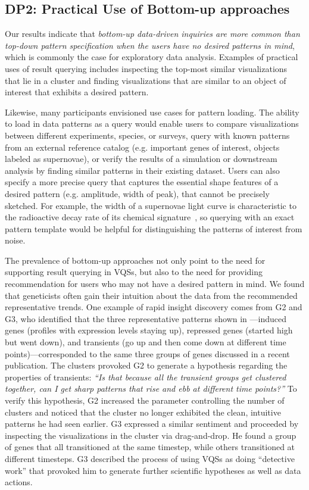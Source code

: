 \subsection{DP2: Practical Use of Bottom-up approaches}
\par Our results indicate that \emph{bottom-up data-driven inquiries are more common than top-down pattern specification when the users have no desired patterns in mind}, which is commonly the case for exploratory data analysis. Examples of practical uses of result querying includes inspecting the top-most similar visualizations that lie in a cluster and finding visualizations that are similar to an object of interest that exhibits a desired pattern. 
\par Likewise, many participants envisioned use cases for pattern loading. The ability to load in data patterns as a query would enable users to compare visualizations between different experiments, species, or surveys, query with known patterns from an external reference catalog (e.g. important genes of interest, objects labeled as supernovae), or verify the results of a simulation or downstream analysis by finding similar patterns in their existing dataset. Users can also specify a more precise query that captures the essential shape features of a desired pattern (e.g. amplitude, width of peak), that cannot be precisely sketched. For example, the width of a supernovae light curve is characteristic to the radioactive decay rate of its chemical signature~\cite{Nugent1997}, so querying with an exact pattern template would be helpful for distinguishing the patterns of interest from noise.
\par The prevalence of bottom-up approaches not only point to the need for supporting result querying in VQSs, but also to the need for providing recommendation for users who may not have a desired pattern in mind. We found that geneticists often gain their intuition about the data from the recommended representative trends. One example of rapid insight discovery comes from G2 and G3, who identified that the three representative patterns shown in \zv---induced genes (profiles with expression levels staying up), repressed genes (started high but went down), and transients (go up and then come down at different time points)---corresponded to the same three groups of genes discussed in a recent publication\cite{Gloss2017}. The clusters provoked G2 to generate a hypothesis regarding the properties of transients: \textit{``Is that because all the transient groups get clustered together, can I get sharp patterns that rise and ebb at different time points?''} To verify this hypothesis, G2 increased the parameter controlling the number of clusters and noticed that the cluster no longer exhibited the clean, intuitive patterns he had seen earlier. G3 expressed a similar sentiment and proceeded by inspecting the visualizations in the cluster via drag-and-drop. He found a group of genes that all transitioned at the same timestep, while others transitioned at different timesteps. G3 described the process of using VQSs as doing ``detective work'' that provoked him to generate further scientific hypotheses as well as data actions.
